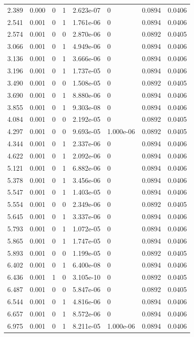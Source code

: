 \documentclass[preview]{standalone}
\begin{document}
{{\begin{tabular}{L{1.2cm}C{1.2cm} C{0.3cm}C{0.5cm} C{1.4cm}C{1.4cm} C{1.4cm}C{1.4cm}}
  2.389  &  0.000  & 0     &  1 &  2.623e-07  & 0  & 0.0894 &  0.0406   \\ 
  2.541  &  0.001  & 0     &  1 &  1.761e-06  & 0  & 0.0894 &  0.0406   \\ 
  2.574  &  0.001  & 0     &  0 &  2.870e-06  & 0  & 0.0892 &  0.0405   \\ 
  3.066  &  0.001  & 0     &  1 &  4.949e-06  & 0  & 0.0894 &  0.0406   \\ 
  3.136  &  0.001  & 0     &  1 &  3.666e-06  & 0  & 0.0894 &  0.0406   \\ 
  3.196  &  0.001  & 0     &  1 &  1.737e-05  & 0  & 0.0894 &  0.0406   \\ 
  3.490  &  0.001  & 0     &  0 &  1.508e-05  & 0  & 0.0892 &  0.0405   \\ 
  3.690  &  0.001  & 0     &  1 &  8.880e-06  & 0  & 0.0894 &  0.0406   \\ 
  3.855  &  0.001  & 0     &  1 &  9.303e-08  & 0  & 0.0894 &  0.0406   \\ 
  4.084  &  0.001  & 0     &  0 &  2.192e-05  & 0  & 0.0892 &  0.0405   \\ 
  4.297  &  0.001  & 0     &  0 &  9.693e-05  & 1.000e-06  & 0.0892 &  0.0405   \\ 
  4.344  &  0.001  & 0     &  1 &  2.337e-06  & 0  & 0.0894 &  0.0406   \\ 
  4.622  &  0.001  & 0     &  1 &  2.092e-06  & 0  & 0.0894 &  0.0406   \\ 
  5.121  &  0.001  & 0     &  1 &  6.882e-06  & 0  & 0.0894 &  0.0406   \\ 
  5.378  &  0.001  & 0     &  1 &  3.456e-06  & 0  & 0.0894 &  0.0406   \\ 
  5.547  &  0.001  & 0     &  1 &  1.403e-05  & 0  & 0.0894 &  0.0406   \\ 
  5.554  &  0.001  & 0     &  0 &  2.349e-06  & 0  & 0.0892 &  0.0405   \\ 
  5.645  &  0.001  & 0     &  1 &  3.337e-06  & 0  & 0.0894 &  0.0406   \\ 
  5.793  &  0.001  & 0     &  1 &  1.072e-05  & 0  & 0.0894 &  0.0406   \\ 
  5.865  &  0.001  & 0     &  1 &  1.747e-05  & 0  & 0.0894 &  0.0406   \\ 
  5.893  &  0.001  & 0     &  0 &  1.199e-05  & 0  & 0.0892 &  0.0405   \\ 
  6.402  &  0.001  & 0     &  1 &  6.400e-08  & 0  & 0.0894 &  0.0406   \\ 
  6.436  &  0.001  & 1     &  0 &  3.105e-10  & 0  & 0.0892 &  0.0405   \\ 
  6.487  &  0.001  & 0     &  0 &  5.847e-06  & 0  & 0.0892 &  0.0405   \\ 
  6.544  &  0.001  & 0     &  1 &  4.816e-06  & 0  & 0.0894 &  0.0406   \\ 
  6.657  &  0.001  & 0     &  1 &  8.572e-06  & 0  & 0.0894 &  0.0406   \\ 
  6.975  &  0.001  & 0     &  1 &  8.211e-05  & 1.000e-06  & 0.0894 &  0.0406   \\ 
\hline 
\end{tabular} 

}}
\end{document}
